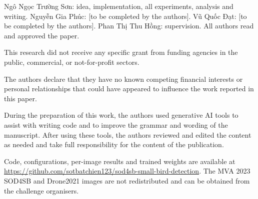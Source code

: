 \documentclass[pdflatex,sn-mathphys-num]{sn-jnl}%
\begin{document}
\backmatter

Ngô Ngọc Trường Sơn: idea, implementation, all experiments, analysis and writing. Nguyễn Gia Phúc: [to be completed
by the authors]. Vũ Quốc Đạt: [to be completed by the authors]. Phan Thị Thu Hồng: supervision. All authors read and
approved the paper.

This research did not receive any specific grant from funding agencies in the public, commercial, or not-for-profit
sectors.

The authors declare that they have no known competing financial interests or personal relationships that could have
appeared to influence the work reported in this paper.

During the preparation of this work, the authors used generative AI tools to assist with writing code and to improve
the grammar and wording of the manuscript. After using these tools, the authors reviewed and edited the content as
needed and take full responsibility for the content of the publication.

Code, configurations, per-image results and trained weights are available at
\url{https://github.com/sotbatchien123/sod4sb-small-bird-detection}. The MVA 2023 SOD4SB and Drone2021 images are
not redistributed and can be obtained from the challenge organisers.


\end{document}
